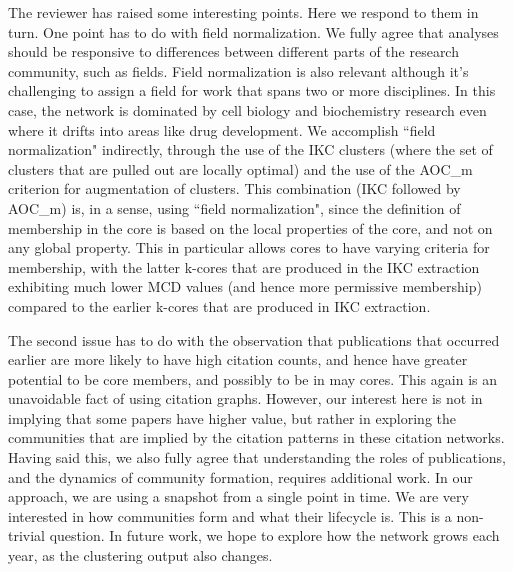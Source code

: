\documentclass[11pt, oneside]{article}   	%
\begin{document}
The reviewer has raised some interesting points. Here we respond to them in turn.
One point has to do with field normalization. We fully agree that analyses should be responsive to differences between different parts of the research community, such as fields.
Field normalization is also relevant although it's challenging to assign a field for work that spans two or more disciplines. In this case, the network is dominated by cell biology and biochemistry research even where it drifts into areas like drug development. 
We accomplish ``field normalization" indirectly, through the use of the IKC clusters  (where the set of clusters that are pulled out are locally optimal) and the use of the AOC\_m  criterion for augmentation of clusters.  
This combination (IKC followed by AOC\_m) is, in a sense, using ``field normalization", since the definition of membership in the core is based on the local properties of the core, and not on any global property.
This in particular allows cores to have varying criteria for membership, with the latter k-cores that are produced in the IKC extraction exhibiting much lower MCD values (and hence more permissive membership) compared to the earlier k-cores that are produced in IKC extraction.



The second issue has to do with the observation that publications that occurred earlier are more likely to have high citation counts, and hence have greater potential to be core members, and possibly to be in may cores.
This again is an unavoidable fact of using citation graphs.  However, our interest here is not in implying that some papers have higher value, but rather in exploring the communities that are implied by the citation patterns in these citation networks. 
Having said this, we also fully  agree that understanding the roles of publications, and the dynamics of community formation, requires additional work. 
In our approach, we are using a snapshot from a single point in time. We are very interested in how communities form and what their lifecycle is. This is a non-trivial question. In future work,
we hope to explore how the network grows each year,  as the clustering output also changes. 
 
\end{document}
